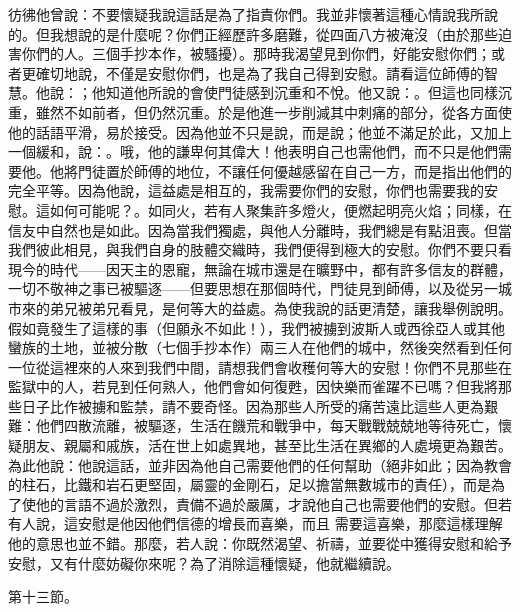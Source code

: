 彷彿他曾說：不要懷疑我說這話是為了指責你們。我並非懷著這種心情說我所說的。但我想說的是什麼呢？你們正經歷許多磨難，從四面八方被淹沒（由於那些迫害你們的人。三個手抄本作，被騷擾）。那時我渴望見到你們，好能安慰你們；或者更確切地說，不僅是安慰你們，也是為了我自己得到安慰。請看這位師傅的智慧。他說：；他知道他所說的會使門徒感到沉重和不悅。他又說：。但這也同樣沉重，雖然不如前者，但仍然沉重。於是他進一步削減其中刺痛的部分，從各方面使他的話語平滑，易於接受。因為他並不只是說，而是說；他並不滿足於此，又加上一個緩和，說：。哦，他的謙卑何其偉大！他表明自己也需他們，而不只是他們需要他。他將門徒置於師傅的地位，不讓任何優越感留在自己一方，而是指出他們的完全平等。因為他說，這益處是相互的，我需要你們的安慰，你們也需要我的安慰。這如何可能呢？。如同火，若有人聚集許多燈火，便燃起明亮火焰；同樣，在信友中自然也是如此。因為當我們獨處，與他人分離時，我們總是有點沮喪。但當我們彼此相見，與我們自身的肢體交織時，我們便得到極大的安慰。你們不要只看現今的時代——因天主的恩寵，無論在城市還是在曠野中，都有許多信友的群體，一切不敬神之事已被驅逐——但要思想在那個時代，門徒見到師傅，以及從另一城市來的弟兄被弟兄看見，是何等大的益處。為使我說的話更清楚，讓我舉例說明。假如竟發生了這樣的事（但願永不如此！），我們被擄到波斯人或西徐亞人或其他蠻族的土地，並被分散（七個手抄本作）兩三人在他們的城中，然後突然看到任何一位從這裡來的人來到我們中間，請想我們會收穫何等大的安慰！你們不見那些在監獄中的人，若見到任何熟人，他們會如何復甦，因快樂而雀躍不已嗎？但我將那些日子比作被擄和監禁，請不要奇怪。因為那些人所受的痛苦遠比這些人更為艱難：他們四散流離，被驅逐，生活在饑荒和戰爭中，每天戰戰兢兢地等待死亡，懷疑朋友、親屬和戚族，活在世上如處異地，甚至比生活在異鄉的人處境更為艱苦。為此他說：他說這話，並非因為他自己需要他們的任何幫助（絕非如此；因為教會的柱石，比鐵和岩石更堅固，屬靈的金剛石，足以擔當無數城市的責任），而是為了使他的言語不過於激烈，責備不過於嚴厲，才說他自己也需要他們的安慰。但若有人說，這安慰是他因他們信德的增長而喜樂，而且  需要這喜樂，那麼這樣理解他的意思也並不錯。那麼，若人說：你既然渴望、祈禱，並要從中獲得安慰和給予安慰，又有什麼妨礙你來呢？為了消除這種懷疑，他就繼續說。\par

第十三節。\par


